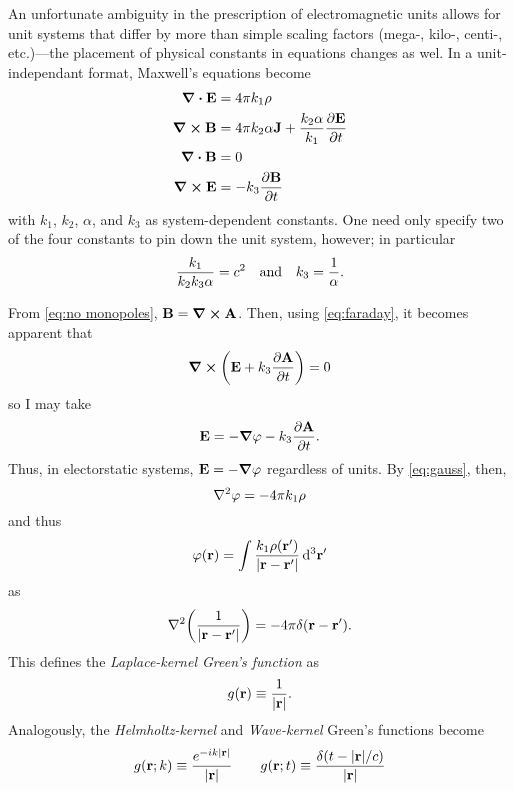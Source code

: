 An unfortunate ambiguity in the prescription of electromagnetic units allows for unit systems that differ by more than simple scaling factors (mega-, kilo-, centi-, etc.)---the placement of physical constants in equations changes as wel.
In a unit-independant format, Maxwell's equations become~\cite{jackson2007classical}
\begin{subequations}
  \begin{align}
    \div{\vb{E}} &= 4 \pi k_1 \rho \label{eq:gauss} \\
    \curl{\vb{B}} &= 4 \pi k_2 \alpha \vb{J} + \frac{k_2 \alpha}{k_1} \pdv{\vb{E}}{t} \label{eq:ampere}\\
    \div{\vb{B}} &= 0 \label{eq:no monopoles} \\
    \curl{\vb{E}} &= - k_3 \pdv{\vb{B}}{t} \label{eq:faraday}
  \end{align}
  \label{eq:time-domain maxwell equations}
\end{subequations}
with $k_1$, $k_2$, $\alpha$, and $k_3$ as system-dependent constants. 
One need only specify two of the four constants to pin down the unit system, however; in particular 
\begin{equation}
  \frac{k_1}{k_2 k_3 \alpha} = c^2 \qq{and} k_3 = \frac{1}{\alpha}.
\end{equation}

From \cref{eq:no monopoles}, $\vb{B} = \curl{\vb{A}}$. 
Then, using \cref{eq:faraday}, it becomes apparent that
\begin{equation*}
  \curl{\qty(\vb{E} + k_3 \pdv{\vb{A}}{t})} = 0
\end{equation*}
so I may take
\begin{equation*}
  \vb{E} = -\grad{\varphi} - k_3 \pdv{\vb{A}}{t}.
\end{equation*}
Thus, in electorstatic systems, $\vb{E} = -\grad{\varphi}$ regardless of units.
By \cref{eq:gauss}, then,
\begin{equation*}
  \laplacian \varphi = -4 \pi k_1 \rho
\end{equation*}
and thus
\begin{equation*}
  \varphi(\vb{r}) = \int \frac{k_1 \rho(\vb{r}')}{\abs{\vb{r} - \vb{r}'}} \dd[3]{\vb{r}'}
\end{equation*}
as
\begin{equation*}
  \laplacian \qty(\frac{1}{\abs{\vb{r} - \vb{r}'}}) = -4 \pi \delta(\vb{r} - \vb{r}').
\end{equation*}
This defines the \emph{Laplace-kernel Green's function} as
\begin{equation}
  g(\vb{r}) \equiv \frac{1}{\abs{\vb{r}}}.
  \label{eq:scalar green}
\end{equation}
Analogously, the \emph{Helmholtz-kernel} and \emph{Wave-kernel} Green's functions become
\begin{equation}
  g(\vb{r}; k) \equiv \frac{e^{-i k \abs{\vb{r}}}}{\abs{\vb{r}}} \qquad
  g(\vb{r}; t) \equiv \frac{\delta(t - \abs{\vb{r}}/c)}{\abs{\vb{r}}}
\end{equation}

